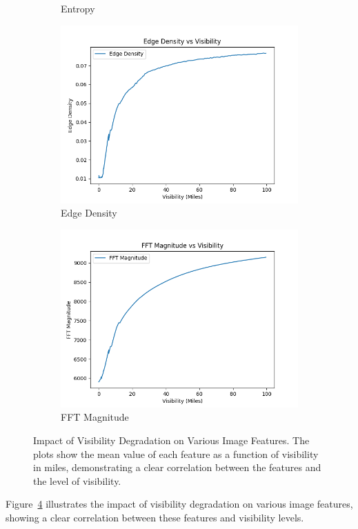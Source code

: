 \begin{figure}[htbp]
\begin{subfigure}[b]{0.24\textwidth}
        \caption{Entropy}
        \label{fig:mean_entropy}
    \end{subfigure}
    \hfill
    \begin{subfigure}[b]{0.24\textwidth}
        \includegraphics[width=\textwidth]{imgs/edge_density_vs_visibility.png}
        \caption{Edge Density}
        \label{fig:mean_edge_density}
    \end{subfigure}
    \hfill
    \begin{subfigure}[b]{0.24\textwidth}
        \includegraphics[width=\textwidth]{imgs/fft_magnitude_vs_visibility.png}
        \caption{FFT Magnitude}
        \label{fig:mean_fft}
    \end{subfigure}
    \caption{Impact of Visibility Degradation on Various Image Features. The plots show the mean value of each feature as a function of visibility in miles, demonstrating a clear correlation between the features and the level of visibility.}
    \label{fig:mean_of_features}
\end{figure}

Figure~\ref{fig:mean_of_features} illustrates the impact of visibility degradation on various image features, showing a clear correlation between these features and visibility levels.